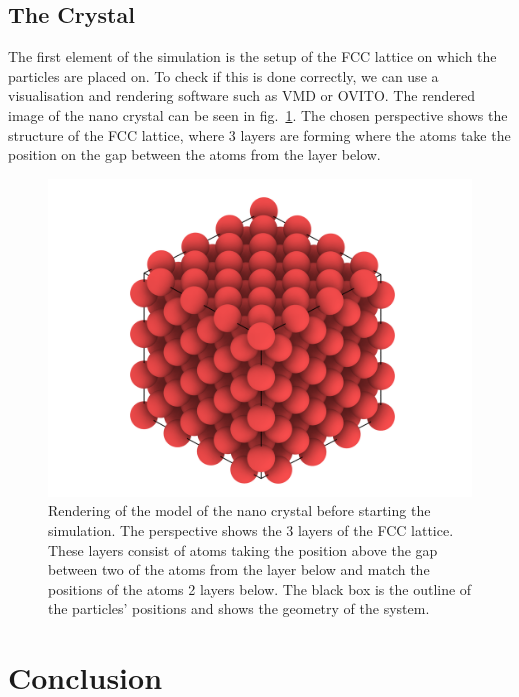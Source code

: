 \documentclass[12pt]{article}
\begin{document}
\subsection{The Crystal}
The first element of the simulation is the setup of the FCC lattice on which the particles are placed on. To check if this is done correctly, we can
use a visualisation and rendering software such as VMD\cite{Humphrey1996} or OVITO\cite{Stukowski2010}. The rendered image of the nano crystal 
can be seen in fig.~\ref{fig:glass}. The chosen perspective shows the structure of the FCC lattice, where 3 layers are forming 
where the atoms take the position on the gap between the atoms from the layer below.\\
\begin{figure}[h]
    \begin{center}
        \includegraphics[scale=0.2]{images/fcc_rendering_new.png}
        \caption{Rendering of the model of the nano crystal before starting the simulation. 
                    The perspective shows the 3 layers of the FCC lattice. These layers consist of atoms
                    taking the position above the gap between two of the atoms from the layer below and match the positions of the atoms 2 layers
                below. The black box is the outline of the particles' positions and shows the geometry of the system.}
        \label{fig:glass}
    \end{center}
\end{figure}






\newpage
\section{Conclusion}






\newpage


\end{document}
